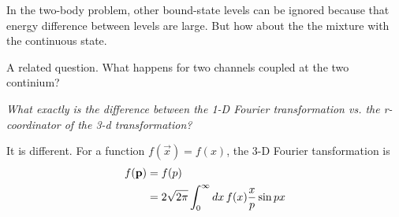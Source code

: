 In the two-body problem, other bound-state levels can be ignored because that energy difference between levels are large.  But how about the the mixture with the continuous state.  

A related question.  What happens for two channels coupled at the two continium? 


\emph{What exactly is the difference between the 1-D Fourier transformation vs. the r-coordinator of the 3-d transformation?}

It is different. For a function $f(\vec{x})=f(x)$, the 3-D Fourier tansformation is 
\begin{equation}
\begin{split}
f(\mathbf{p})&=f(p)\\
	&=2\sqrt{2\pi}\int^\infty_0dx\,f(x)\frac{x}{p}\sin{px}
\end{split}
\end{equation}



